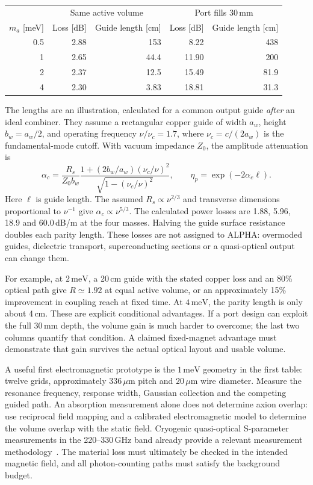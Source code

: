 \documentclass[10pt]{article}
\newcommand{\meV}{\,\mathrm{meV}}
\begin{document}
\begin{center}
\begin{tabular}{rrrrr}
\toprule
& \multicolumn{2}{c}{Same active volume} & \multicolumn{2}{c}{Port fills 30\,mm}\\
$m_a$ [meV] & Loss [dB] & Guide length [cm] & Loss [dB] & Guide length [cm]\\
\midrule
0.5 & 2.88 & 153 & 8.22 & 438\\
1 & 2.65 & 44.4 & 11.90 & 200\\
2 & 2.37 & 12.5 & 15.49 & 81.9\\
4 & 2.30 & 3.83 & 18.81 & 31.3\\
\bottomrule
\end{tabular}
\end{center}
The lengths are an illustration, calculated for a common output guide \emph{after} an ideal combiner. They assume a rectangular copper guide of width $a_w$, height $b_w=a_w/2$, and operating frequency $\nu/\nu_c=1.7$, where $\nu_c=c/(2a_w)$ is the fundamental-mode cutoff. With vacuum impedance $Z_0$, the amplitude attenuation is~\cite{guide}
\begin{equation}
 \alpha_c=\frac{R_s}{Z_0 b_w}
 \frac{1+(2b_w/a_w)(\nu_c/\nu)^2}{\sqrt{1-(\nu_c/\nu)^2}},
 \qquad \eta_p=\exp(-2\alpha_c\ell).
 \label{eq:guide}
\end{equation}
Here $\ell$ is guide length. The assumed $R_s\propto\nu^{2/3}$ and transverse dimensions proportional to $\nu^{-1}$ give $\alpha_c\propto\nu^{5/3}$. The calculated power losses are 1.88, 5.96, 18.9 and 60.0\,dB/m at the four masses. Halving the guide surface resistance doubles each parity length. These losses are not assigned to ALPHA: overmoded guides, dielectric transport, superconducting sections or a quasi-optical output can change them.

For example, at $2\meV$, a 20\,cm guide with the stated copper loss and an 80\% optical path give $R\simeq1.92$ at equal active volume, or an approximately 15\% improvement in coupling reach at fixed time. At $4\meV$, the parity length is only about 4\,cm. These are explicit conditional advantages. If a port design can exploit the full 30\,mm depth, the volume gain is much harder to overcome; the last two columns quantify that condition. A claimed fixed-magnet advantage must demonstrate that gain survives the actual optical layout and usable volume.

A useful first electromagnetic prototype is the $1\meV$ geometry in the first table: twelve grids, approximately $336\,\mu$m pitch and $20\,\mu$m wire diameter. Measure the resonance frequency, response width, Gaussian collection and the competing guided path. An absorption measurement alone does not determine axion overlap: use reciprocal field mapping and a calibrated electromagnetic model to determine the volume overlap with the static field. Cryogenic quasi-optical S-parameter measurements in the 220--330\,GHz band already provide a relevant measurement methodology~\cite{quasioptic}. The material loss must ultimately be checked in the intended magnetic field, and all photon-counting paths must satisfy the background budget.
\end{document}
